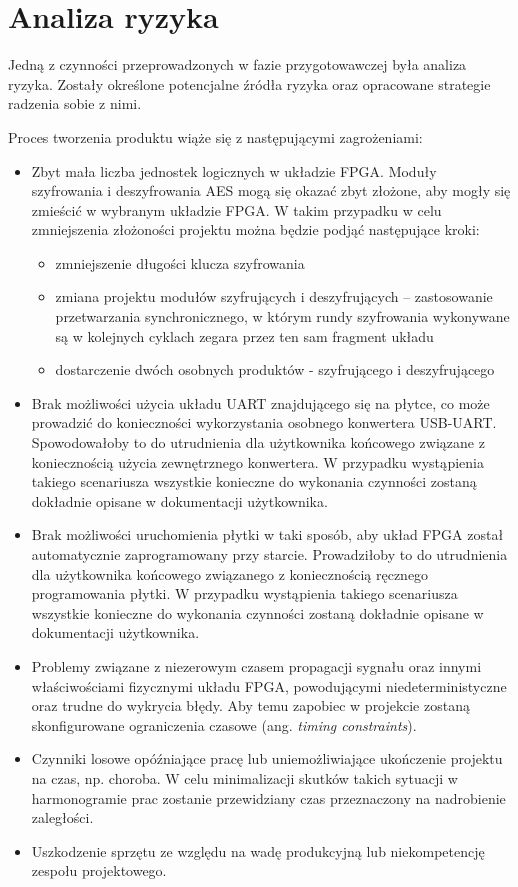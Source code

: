 \section{Analiza ryzyka}
\label{sec:analiza-ryzyka}
Jedną z czynności przeprowadzonych w fazie przygotowawczej była analiza ryzyka. Zostały określone potencjalne źródła ryzyka oraz opracowane strategie radzenia sobie z nimi.

Proces tworzenia produktu wiąże się z następującymi zagrożeniami:
\begin{itemize}

\item Zbyt mała liczba jednostek logicznych w układzie FPGA. Moduły szyfrowania i deszyfrowania AES mogą się okazać zbyt złożone, aby mogły się zmieścić w wybranym układzie FPGA. W takim przypadku w celu zmniejszenia złożoności projektu można będzie podjąć następujące kroki:
	\begin{itemize}
	\item zmniejszenie długości klucza szyfrowania
	\item zmiana projektu modułów szyfrujących i deszyfrujących -- zastosowanie przetwarzania synchronicznego, w którym rundy szyfrowania wykonywane są w kolejnych cyklach zegara przez ten sam fragment układu
	\item dostarczenie dwóch osobnych produktów - szyfrującego i deszyfrującego
	\end{itemize}
\item Brak możliwości użycia układu UART znajdującego się na płytce, co może prowadzić do konieczności wykorzystania osobnego konwertera USB-UART. Spowodowałoby to do utrudnienia dla użytkownika końcowego związane z koniecznością użycia zewnętrznego konwertera. W przypadku wystąpienia takiego scenariusza wszystkie konieczne do wykonania czynności zostaną dokładnie opisane w dokumentacji użytkownika.
\item Brak możliwości uruchomienia płytki w taki sposób, aby układ FPGA został automatycznie zaprogramowany przy starcie. Prowadziłoby to do utrudnienia dla użytkownika końcowego związanego z koniecznością ręcznego programowania płytki. W przypadku wystąpienia takiego scenariusza wszystkie konieczne do wykonania czynności zostaną dokładnie opisane w dokumentacji użytkownika.
\item Problemy związane z niezerowym czasem propagacji sygnału oraz innymi właściwościami fizycznymi układu FPGA, powodującymi niedeterministyczne oraz trudne do wykrycia błędy. Aby temu zapobiec w projekcie zostaną skonfigurowane ograniczenia czasowe (ang. \textit{timing constraints}).
\item Czynniki losowe opóźniające pracę lub uniemożliwiające ukończenie projektu na czas, np. choroba. W celu minimalizacji skutków takich sytuacji w harmonogramie prac zostanie przewidziany czas przeznaczony na nadrobienie zaległości.
\item Uszkodzenie sprzętu ze względu na wadę produkcyjną lub niekompetencję zespołu projektowego.
\end{itemize}



\newpage